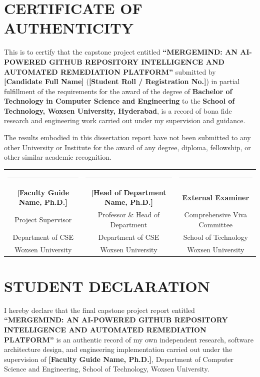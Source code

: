 \documentclass[12pt,a4paper,oneside]{report}
\begin{document}
\cleardoublepage

\chapter*{CERTIFICATE OF AUTHENTICITY}

This is to certify that the capstone project entitled \textbf{``MERGEMIND: AN AI-POWERED GITHUB REPOSITORY INTELLIGENCE AND AUTOMATED REMEDIATION PLATFORM''} submitted by \textbf{[Candidate Full Name]} (\textbf{[Student Roll / Registration No.]}) in partial fulfillment of the requirements for the award of the degree of \textbf{Bachelor of Technology in Computer Science and Engineering} to the \textbf{School of Technology, Woxsen University, Hyderabad}, is a record of bona fide research and engineering work carried out under my supervision and guidance.

\vspace{0.6cm}
The results embodied in this dissertation report have not been submitted to any other University or Institute for the award of any degree, diploma, fellowship, or other similar academic recognition.

\vspace{3.5cm}

\noindent
\begin{tabular*}{\textwidth}{@{\extracolsep{\fill}}ccc}
    \rule{4.5cm}{0.4pt} & \rule{4.5cm}{0.4pt} & \rule{4.5cm}{0.4pt} \\
    \textbf{[Faculty Guide Name, Ph.D.]} & \textbf{[Head of Department Name, Ph.D.]} & \textbf{External Examiner} \\
    Project Supervisor & Professor \& Head of Department & Comprehensive Viva Committee \\
    Department of CSE & Department of CSE & School of Technology \\
    Woxsen University & Woxsen University & Woxsen University \\
\end{tabular*}

\cleardoublepage

\chapter*{STUDENT DECLARATION}

I hereby declare that the final capstone project report entitled \textbf{``MERGEMIND: AN AI-POWERED GITHUB REPOSITORY INTELLIGENCE AND AUTOMATED REMEDIATION PLATFORM''} is an authentic record of my own independent research, software architecture design, and engineering implementation carried out under the supervision of \textbf{[Faculty Guide Name, Ph.D.]}, Department of Computer Science and Engineering, School of Technology, Woxsen University.
\end{document}
